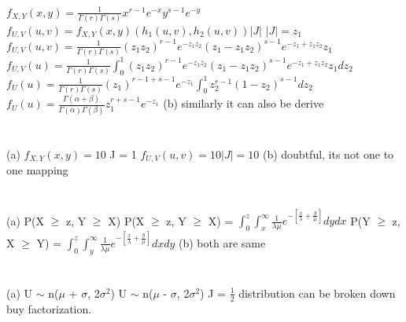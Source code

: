 \documentclass{report}
\begin{document}
\section{}
$f_{X, Y}(x, y) = \frac{1}{\Gamma(r)\Gamma(s)}x^{r-1}e^{-x}y^{s-1}e^{-y}$
\newline
$f_{U, V}(u, v) = f_{X, Y}(x, y)(h_1(u, v), h_2(u, v))|J|$
\newline
$|J| = z_1$
\newline
$f_{U, V}(u, v) = \frac{1}{\Gamma(r)\Gamma(s)}(z_1z_2)^{r-1}e^{-z_1z_2}(z_1 - z_1z_2)^{s-1}e^{-z_1 + z_1z_2}z_1$
\newline
$f_{U, V}(u) = \frac{1}{\Gamma(r)\Gamma(s)}\int_{0}^{1}(z_1z_2)^{r-1}e^{-z_1z_2}(z_1 - z_1z_2)^{s-1}e^{-z_1 + z_1z_2}z_1dz_2$
\newline
$f_{U}(u) = \frac{1}{\Gamma(r)\Gamma(s)}(z_1)^{r-1 + s-1}e^{-z_1}\int_{0}^{1}z_2^{r-1}(1 - z_2)^{s-1}dz_2$
\newline
$f_{U}(u) = \frac{\Gamma(\alpha + \beta)}{\Gamma(\alpha)\Gamma(\beta)}z_1^{r + s - 1}e^{-z_1}$
\newline
(b) similarly it can also be derive
\newline
\section{}
(a) $f_{X, Y}(x, y) = 10$
\newline
J = 1
\newline
$f_{U, V}(u, v) = 10|J| = 10$
\newline
(b) doubtful, its not one to one mapping
\newline
\section{}
(a) P(X $\ge$ z, Y $\ge$ X)
\newline
P(X $\ge$ z, Y $\ge$ X) = $\int_{0}^{z}\int_{x}^{\infty}\frac{1}{\lambda\mu}e^{-\left[\frac{x}{\lambda} + \frac{y}{\mu}\right]}dydx$
\newline
P(Y $\ge$ z, X $\ge$ Y) = $\int_{0}^{z}\int_{y}^{\infty}\frac{1}{\lambda\mu}e^{-\left[\frac{x}{\lambda} + \frac{y}{\mu}\right]}dxdy$
\newline
(b) both are same
\section{}
(a) U $\sim$ n($\mu$ + $\sigma$, 2$\sigma^2$)
\newline
U $\sim$ n($\mu$ - $\sigma$, 2$\sigma^2$)
\newline
J = $\frac{1}{2}$
\newline
distribution can be broken down buy factorization.
\newline
\end{document}
